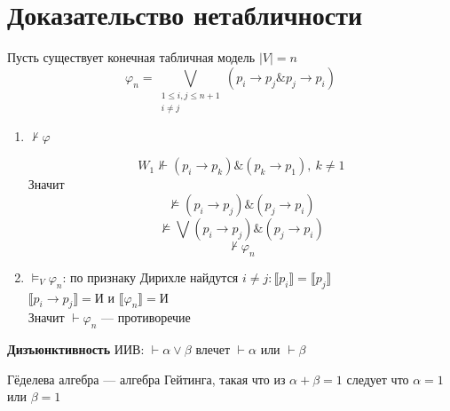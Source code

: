 \documentclass[english]{article}
\begin{document}
\section{Доказательство нетабличности}
\label{sec:orgec6ba08}
Пусть существует конечная табличная модель \(|V| = n\)
\[ \varphi_n =  \bigvee_{\substack{1 \le i, j \le n + 1 \\ i \neq j}} (p_i \to p_j \&p_j \to p_i)\]
\begin{enumerate}
	\item \(\not\vdash\varphi\)
	      \begin{center}
	      \end{center}
	      \[ W_1 \not\Vdash (p_i \to p_k)\&(p_k\to p_1),\ k\neq 1 \]
	      Значит \[ \not\vDash (p_i\to p_j)\&(p_j\to p_i) \]
	      \[ \not\vDash \bigvee (p_i\to p_j)\&(p_j\to p_i) \]
	      \[ \not\vdash\varphi_n \]
	\item \(\vDash_V \varphi_n\): по признаку Дирихле найдутся \(i\neq j:\llbracket p_i \rrbracket = \llbracket p_j \rrbracket\) \\
	      \(\llbracket p_i \to p_j \rrbracket = \text{И}\) и \(\llbracket \varphi_n \rrbracket = \text{И}\) \\
	      Значит \(\vdash \varphi_n\) --- противоречие
\end{enumerate}
\begin{definition}
	\textbf{Дизъюнктивность} ИИВ: \(\vdash \alpha \vee \beta\) влечет \(\vdash \alpha\) или \(\vdash \beta\)
	\label{org1a36943}
\end{definition}
\begin{definition}
	Гёделева алгебра --- алгебра Гейтинга, такая что из \(\alpha + \beta = 1\) следует что \(\alpha = 1\) или \(\beta = 1\) \\
	\label{org1a81ffa}
\end{definition}
\end{document}
